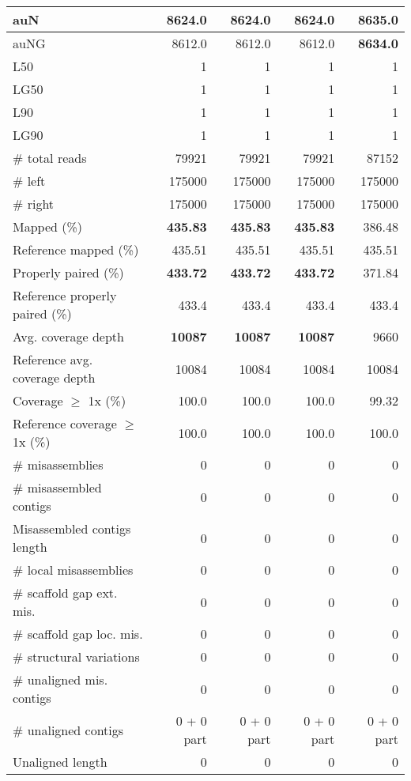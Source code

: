 \documentclass[12pt,a4paper]{article}
\begin{document}
\begin{table}[ht]
\begin{center}
\begin{tabular}{|l*{4}{|r}|}
auN & 8624.0 & 8624.0 & 8624.0 & {\bf 8635.0} \\ \hline
auNG & 8612.0 & 8612.0 & 8612.0 & {\bf 8634.0} \\ \hline
L50 & 1 & 1 & 1 & 1 \\ \hline
LG50 & 1 & 1 & 1 & 1 \\ \hline
L90 & 1 & 1 & 1 & 1 \\ \hline
LG90 & 1 & 1 & 1 & 1 \\ \hline
\# total reads & 79921 & 79921 & 79921 & 87152 \\ \hline
\# left & 175000 & 175000 & 175000 & 175000 \\ \hline
\# right & 175000 & 175000 & 175000 & 175000 \\ \hline
Mapped (\%) & {\bf 435.83} & {\bf 435.83} & {\bf 435.83} & 386.48 \\ \hline
Reference mapped (\%) & 435.51 & 435.51 & 435.51 & 435.51 \\ \hline
Properly paired (\%) & {\bf 433.72} & {\bf 433.72} & {\bf 433.72} & 371.84 \\ \hline
Reference properly paired (\%) & 433.4 & 433.4 & 433.4 & 433.4 \\ \hline
Avg. coverage depth & {\bf 10087} & {\bf 10087} & {\bf 10087} & 9660 \\ \hline
Reference avg. coverage depth & 10084 & 10084 & 10084 & 10084 \\ \hline
Coverage $\geq$ 1x (\%) & 100.0 & 100.0 & 100.0 & 99.32 \\ \hline
Reference coverage $\geq$ 1x (\%) & 100.0 & 100.0 & 100.0 & 100.0 \\ \hline
\# misassemblies & 0 & 0 & 0 & 0 \\ \hline
\# misassembled contigs & 0 & 0 & 0 & 0 \\ \hline
Misassembled contigs length & 0 & 0 & 0 & 0 \\ \hline
\# local misassemblies & 0 & 0 & 0 & 0 \\ \hline
\# scaffold gap ext. mis. & 0 & 0 & 0 & 0 \\ \hline
\# scaffold gap loc. mis. & 0 & 0 & 0 & 0 \\ \hline
\# structural variations & 0 & 0 & 0 & 0 \\ \hline
\# unaligned mis. contigs & 0 & 0 & 0 & 0 \\ \hline
\# unaligned contigs & 0 + 0 part & 0 + 0 part & 0 + 0 part & 0 + 0 part \\ \hline
Unaligned length & 0 & 0 & 0 & 0 \\ \hline

\end{tabular}
\end{center}
\end{table}
\end{document}
